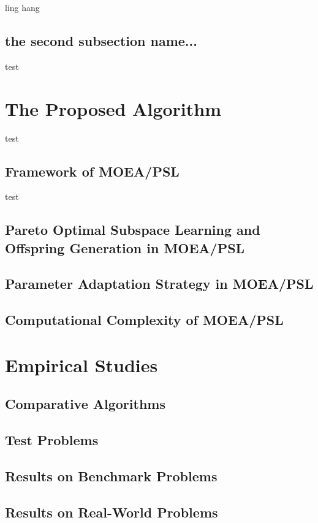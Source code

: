 \documentclass[journal]{IEEEtran}
\begin{document}
ling hang

\subsection{the second subsection name...}
test
\section{The Proposed Algorithm}
test
\subsection{Framework of MOEA/PSL}
test
\subsection{Pareto Optimal Subspace Learning and Offspring Generation in MOEA/PSL}

\subsection{Parameter Adaptation Strategy in MOEA/PSL}

\subsection{Computational Complexity of MOEA/PSL}


\section{Empirical Studies}


\subsection{Comparative Algorithms}

\subsection{Test Problems}

\subsection{Results on Benchmark Problems}

\subsection{Results on Real-World Problems}
\end{document}
